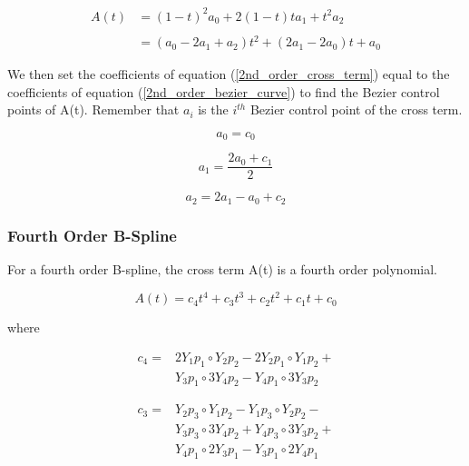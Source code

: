 \documentclass{article}
\begin{document}
 \begin{equation} \label{2nd_order_bezier_curve}
 \begin{aligned}
    A(t) &= (1-t)^2 a_0 + 2(1-t)t a_1 + t^2 a_2 \\\\
    &= (a_0 - 2a_1 + a_2)t^2 + (2a_1 - 2a_0)t + a_0
\end{aligned}
 \end{equation}

We then set the coefficients of equation (\ref{2nd_order_cross_term}) equal to the coefficients of equation (\ref{2nd_order_bezier_curve}) to find the Bezier control points of A(t). Remember that \(a_i\) is the \(i^{th}\) Bezier control point of the cross term. 

\begin{equation}
    a_0 = c_0
\end{equation}

\begin{equation}
    a_1 = \frac{2a_0 + c_1}{2}
\end{equation}

\begin{equation}
    a_2 = 2a_1 - a_0 + c_2
\end{equation}

\subsubsection{Fourth Order B-Spline}

 For a fourth order B-spline, the cross term A(t) is a fourth order polynomial.
 
 \begin{equation} \label{4th_order_cross_term}
     A(t) = c_4 t^4  + c_3 t^3 + c_2 t^2  + c_1 t + c_0
 \end{equation}
 
 where
 
\begin{equation}
\begin{aligned}
    c_4 =& 2Y_1 p_1 \circ Y_2 p_2 - 2Y_2 p_1 \circ Y_1p_2 + \\
         & Y_3 p_1 \circ 3Y_4 p_2 - Y_4 p_1 \circ 3Y_3p_2
\end{aligned}
\end{equation}

\begin{equation}
\begin{aligned}
    c_3 =& Y_2 p_3 \circ    Y_1 p_2 -  Y_1 p_3 \circ    Y_2 p_2 -  \\
         & Y_3 p_3 \circ  3 Y_4 p_2 +  Y_4 p_3 \circ  3 Y_3 p_2 + \\
         & Y_4 p_1 \circ  2 Y_3 p_1 -  Y_3 p_1 \circ  2 Y_4 p_1
\end{aligned}
\end{equation}
    
\end{document}
